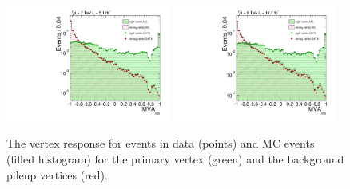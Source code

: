 \begin{figure}
  \includegraphics[width=0.48\textwidth]{analysis_comps/plots/vertex_bdt_output_7TeV_log.pdf}
  \includegraphics[width=0.48\textwidth]{analysis_comps/plots/vertex_bdt_output_8TeV_log.pdf}
  \caption[The vertex \acs{BDT} response for \Zmumu events]{The vertex \BDT response for \Zmumu events in data (points) and MC events (filled histogram) for the primary vertex (green) and the background pileup vertices (red).}
  \label{fig:vertex_bdt_response}
\end{figure}

